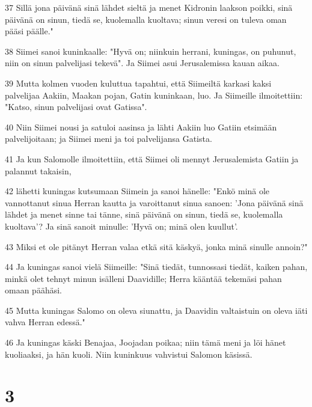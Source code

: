 \par 37 Sillä jona päivänä sinä lähdet sieltä ja menet Kidronin laakson poikki, sinä päivänä on sinun, tiedä se, kuolemalla kuoltava; sinun veresi on tuleva oman pääsi päälle."
\par 38 Siimei sanoi kuninkaalle: "Hyvä on; niinkuin herrani, kuningas, on puhunut, niin on sinun palvelijasi tekevä". Ja Siimei asui Jerusalemissa kauan aikaa.
\par 39 Mutta kolmen vuoden kuluttua tapahtui, että Siimeiltä karkasi kaksi palvelijaa Aakiin, Maakan pojan, Gatin kuninkaan, luo. Ja Siimeille ilmoitettiin: "Katso, sinun palvelijasi ovat Gatissa".
\par 40 Niin Siimei nousi ja satuloi aasinsa ja lähti Aakiin luo Gatiin etsimään palvelijoitaan; ja Siimei meni ja toi palvelijansa Gatista.
\par 41 Ja kun Salomolle ilmoitettiin, että Siimei oli mennyt Jerusalemista Gatiin ja palannut takaisin,
\par 42 lähetti kuningas kutsumaan Siimein ja sanoi hänelle: "Enkö minä ole vannottanut sinua Herran kautta ja varoittanut sinua sanoen: 'Jona päivänä sinä lähdet ja menet sinne tai tänne, sinä päivänä on sinun, tiedä se, kuolemalla kuoltava'? Ja sinä sanoit minulle: 'Hyvä on; minä olen kuullut'.
\par 43 Miksi et ole pitänyt Herran valaa etkä sitä käskyä, jonka minä sinulle annoin?"
\par 44 Ja kuningas sanoi vielä Siimeille: "Sinä tiedät, tunnossasi tiedät, kaiken pahan, minkä olet tehnyt minun isälleni Daavidille; Herra kääntää tekemäsi pahan omaan päähäsi.
\par 45 Mutta kuningas Salomo on oleva siunattu, ja Daavidin valtaistuin on oleva iäti vahva Herran edessä."
\par 46 Ja kuningas käski Benajaa, Joojadan poikaa; niin tämä meni ja löi hänet kuoliaaksi, ja hän kuoli. Niin kuninkuus vahvistui Salomon käsissä.

\chapter{3}

